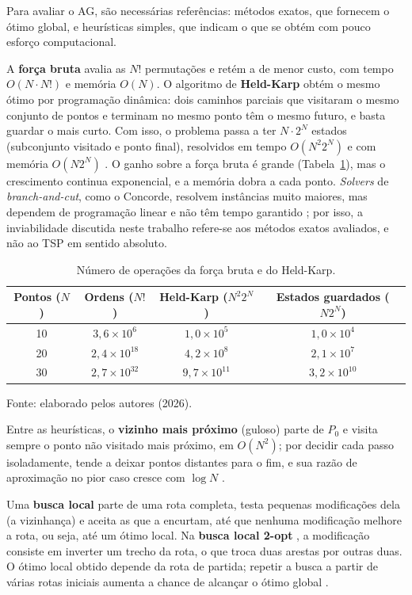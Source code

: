 Para avaliar o AG, são necessárias referências: métodos exatos, que fornecem o ótimo global, e heurísticas simples, que indicam o que se obtém com pouco esforço computacional.

A \textbf{força bruta} avalia as $N!$ permutações e retém a de menor custo, com tempo $O(N \cdot N!)$ e memória $O(N)$. O algoritmo de \textbf{Held-Karp} \cite{bellman1962,held1962} obtém o mesmo ótimo por programação dinâmica: dois caminhos parciais que visitaram o mesmo conjunto de pontos e terminam no mesmo ponto têm o mesmo futuro, e basta guardar o mais curto. Com isso, o problema passa a ter $N \cdot 2^N$ estados (subconjunto visitado e ponto final), resolvidos em tempo $O(N^2 2^N)$ e com memória $O(N 2^N)$ \cite{held1962}. O ganho sobre a força bruta é grande (Tabela~\ref{tab:rotas_crescimento}), mas o crescimento continua exponencial, e a memória dobra a cada ponto. \textit{Solvers} de \textit{branch-and-cut}, como o Concorde, resolvem instâncias muito maiores, mas dependem de programação linear e não têm tempo garantido \cite{applegate2006}; por isso, a inviabilidade discutida neste trabalho refere-se aos métodos exatos avaliados, e não ao TSP em sentido absoluto.

\begin{table}[H]
    \centering
    \caption{Número de operações da força bruta e do Held-Karp.}
    \label{tab:rotas_crescimento}
    \small
    \renewcommand{\arraystretch}{1.25}
    \begin{tabular}{cccc}
        \hline
        \textbf{Pontos ($N$)} & \textbf{Ordens ($N!$)} & \textbf{Held-Karp ($N^2 2^N$)} & \textbf{Estados guardados ($N 2^N$)} \\
        \hline
        10 & $3{,}6 \times 10^{6}$ & $1{,}0 \times 10^{5}$ & $1{,}0 \times 10^{4}$ \\
        20 & $2{,}4 \times 10^{18}$ & $4{,}2 \times 10^{8}$ & $2{,}1 \times 10^{7}$ \\
        30 & $2{,}7 \times 10^{32}$ & $9{,}7 \times 10^{11}$ & $3{,}2 \times 10^{10}$ \\
        \hline
    \end{tabular}
    \par\vspace{0.2cm}
    \footnotesize Fonte: elaborado pelos autores (2026).
\end{table}

Entre as heurísticas, o \textbf{vizinho mais próximo} (guloso) parte de $P_0$ e visita sempre o ponto não visitado mais próximo, em $O(N^2)$; por decidir cada passo isoladamente, tende a deixar pontos distantes para o fim, e sua razão de aproximação no pior caso cresce com $\log N$ \cite{rosenkrantz1977}.

Uma \textbf{busca local} parte de uma rota completa, testa pequenas modificações dela (a vizinhança) e aceita as que a encurtam, até que nenhuma modificação melhore a rota, ou seja, até um ótimo local. Na \textbf{busca local 2-opt} \cite{croes1958}, a modificação consiste em inverter um trecho da rota, o que troca duas arestas por outras duas. O ótimo local obtido depende da rota de partida; repetir a busca a partir de várias rotas iniciais aumenta a chance de alcançar o ótimo global \cite{johnson1997}.
